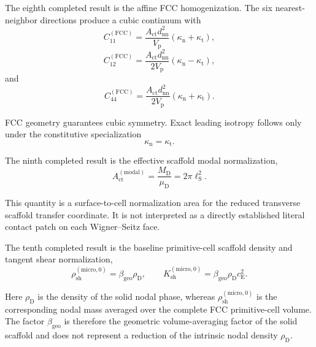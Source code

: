 The eighth completed result is the affine FCC homogenization. The six nearest-neighbor directions produce a cubic continuum with
\begin{equation}
    C_{11}^{(\mathrm{FCC})} = \frac{A_{\mathrm{ct}}d_{\mathrm{nn}}^2}{V_{\mathrm{p}}} \left( \kappa_{\mathrm{n}} + \kappa_{\mathrm{t}} \right),
\end{equation}
\begin{equation}
    C_{12}^{(\mathrm{FCC})} = \frac{A_{\mathrm{ct}}d_{\mathrm{nn}}^2}{2V_{\mathrm{p}}} \left( \kappa_{\mathrm{n}} - \kappa_{\mathrm{t}} \right),
\end{equation}
and
\begin{equation}
    C_{44}^{(\mathrm{FCC})} = \frac{A_{\mathrm{ct}}d_{\mathrm{nn}}^2}{2V_{\mathrm{p}}} \left( \kappa_{\mathrm{n}} + \kappa_{\mathrm{t}} \right).
\end{equation}

FCC geometry guarantees cubic symmetry. Exact leading isotropy follows only under the constitutive specialization
\begin{equation}
    \kappa_{\mathrm{n}} = \kappa_{\mathrm{t}}.
\end{equation}

The ninth completed result is the effective scaffold modal normalization,
\begin{equation}
    A_{\mathrm{ct}}^{(\mathrm{modal})} = \frac{M_{\mathrm{D}}}{\mu_{\mathrm{D}}} = 2\pi\ell_{\mathrm{S}}^2.
\end{equation}

This quantity is a surface-to-cell normalization area for the reduced transverse scaffold transfer coordinate. It is not interpreted as a directly established literal contact patch on each Wigner--Seitz face.

The tenth completed result is the baseline primitive-cell scaffold density and tangent shear normalization,
\begin{equation}
    \rho_{\mathrm{sh}}^{(\mathrm{micro},0)} = \beta_{\mathrm{geo}}\rho_{\mathrm{D}},
    \qquad
    K_{\mathrm{sh}}^{(\mathrm{micro},0)} = \beta_{\mathrm{geo}}\rho_{\mathrm{D}}c_{\mathrm{E}}^2.
\end{equation}

Here $\rho_{\mathrm{D}}$ is the density of the solid nodal phase, whereas $\rho_{\mathrm{sh}}^{(\mathrm{micro},0)}$ is the corresponding nodal mass averaged over the complete FCC primitive-cell volume. The factor $\beta_{\mathrm{geo}}$ is therefore the geometric volume-averaging factor of the solid scaffold and does not represent a reduction of the intrinsic nodal density $\rho_{\mathrm{D}}$.

